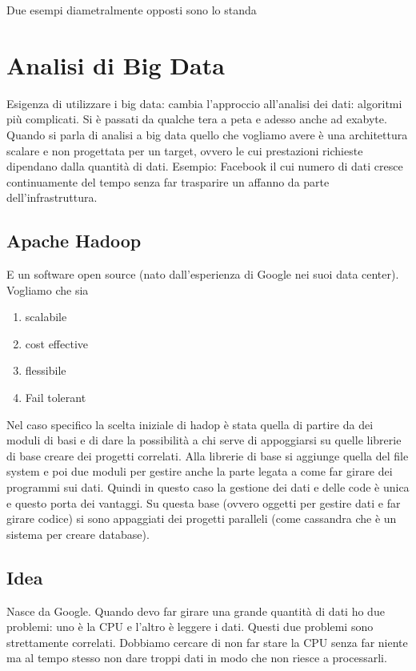 Due esempi diametralmente opposti sono lo standa

\section{Analisi di Big Data}\label{analisi-di-big-data}

Esigenza di utilizzare i big data: cambia l'approccio all'analisi dei
dati: algoritmi più complicati. Si è passati da qualche tera a peta e
adesso anche ad exabyte. Quando si parla di analisi a big data quello
che vogliamo avere è una architettura scalare e non progettata per un
target, ovvero le cui prestazioni richieste dipendano dalla quantità di
dati. Esempio: Facebook il cui numero di dati cresce continuamente del
tempo senza far trasparire un affanno da parte dell'infrastruttura.

\subsection{Apache Hadoop}\label{apache-hadoop}

E un software open source (nato dall'esperienza di Google nei suoi data
center). Vogliamo che sia

\begin{enumerate}
\def\labelenumi{\arabic{enumi}.}
\tightlist
\item
  scalabile
\item
  cost effective
\item
  flessibile
\item
  Fail tolerant
\end{enumerate}

Nel caso specifico la scelta iniziale di hadop è stata quella di partire
da dei moduli di basi e di dare la possibilità a chi serve di
appoggiarsi su quelle librerie di base creare dei progetti correlati.
Alla librerie di base si aggiunge quella del file system e poi due
moduli per gestire anche la parte legata a come far girare dei programmi
sui dati. Quindi in questo caso la gestione dei dati e delle code è
unica e questo porta dei vantaggi. Su questa base (ovvero oggetti per
gestire dati e far girare codice) si sono appaggiati dei progetti
paralleli (come cassandra che è un sistema per creare database).
\subsection{Idea} Nasce da Google. Quando devo far girare una grande
quantità di dati ho due problemi: uno è la CPU e l'altro è leggere i
dati. Questi due problemi sono strettamente correlati. Dobbiamo cercare
di non far stare la CPU senza far niente ma al tempo stesso non dare
troppi dati in modo che non riesce a processarli.

